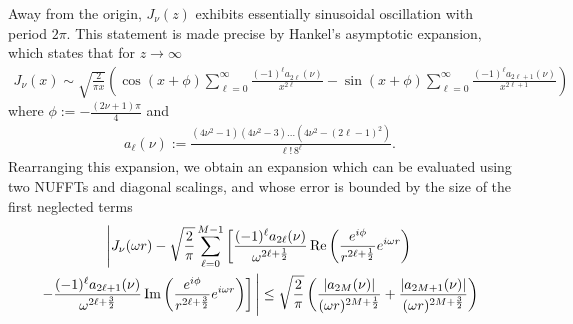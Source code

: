 Away from the origin, $J_\nu(z)$ exhibits essentially sinusoidal oscillation
with period $2\pi$. This statement is made precise by Hankel's asymptotic
expansion, which states that for $z \to \infty$
\begin{align} \label{eq:asymptotic-expansion}
    J_\nu(x)
    \sim \sqrt{\frac{2}{\pi x}} \left( 
        \cos\left(x + \phi\right) \sum_{\ell=0}^{\infty} \frac{(-1)^\ell a_{2\ell}(\nu)}{x^{2\ell}}
        - \sin\left(x + \phi\right) \sum_{\ell=0}^{\infty} \frac{(-1)^\ell a_{2\ell+1}(\nu)}{x^{2\ell+1}}
        \right)
\end{align}
where $\phi := - \frac{(2\nu+1)\pi}{4}$ and 
\begin{align}
    a_\ell(\nu) := \frac{(4\nu^2 - 1)(4\nu^2 - 3)\dots(4\nu^2 -
  (2\ell-1)^2)}{\ell! \, 8^\ell}.
\end{align}
Rearranging this expansion, we obtain an expansion which can be evaluated using
two NUFFTs and diagonal scalings, and whose error is bounded by the size of the
first neglected terms \todocite
\begin{multline}
     \Bigg| J_\nu(\omega r)
    - \sqrt{\frac{2}{\pi}} \sum_{\ell=0}^{M-1} \left[  
        \frac{(-1)^\ell a_{2\ell}(\nu)}{\omega^{2\ell + \frac{1}{2}}} \operatorname*{Re}\left(
          \frac{e^{i\phi}}{r^{2\ell+\frac{1}{2}}} e^{i\omega r}\right) \right.
        \\ \left. - \frac{(-1)^\ell
            a_{2\ell+1}(\nu)}{\omega^{2\ell+\frac{3}{2}}}
          \operatorname*{Im}\left(\frac{e^{i\phi}}{r^{2\ell+\frac{3}{2}}} e^{i\omega r} \right) \right]
        \Bigg| 
         \leq \sqrt{\frac{2}{\pi}} \left( \frac{\left|a_{2M}(\nu)\right|}{(\omega r)^{2M+\frac{1}{2}}} + \frac{\left|a_{2M+1}(\nu)\right|}{(\omega r)^{2M+\frac{3}{2}}} \right)
\end{multline}

